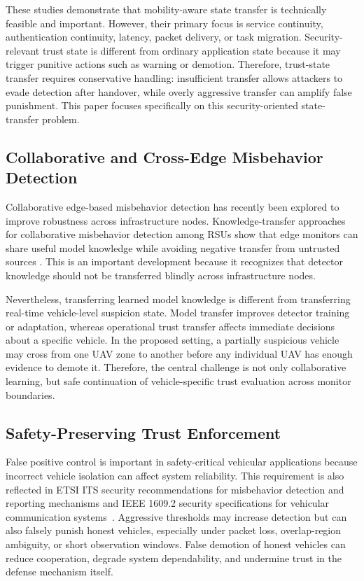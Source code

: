 \documentclass[journal]{IEEEtran}
\begin{document}
These studies demonstrate that mobility-aware state transfer is technically feasible and important. However, their primary focus is service continuity, authentication continuity, latency, packet delivery, or task migration. Security-relevant trust state is different from ordinary application state because it may trigger punitive actions such as warning or demotion. Therefore, trust-state transfer requires conservative handling: insufficient transfer allows attackers to evade detection after handover, while overly aggressive transfer can amplify false punishment. This paper focuses specifically on this security-oriented state-transfer problem.

\subsection{Collaborative and Cross-Edge Misbehavior Detection}
\label{subsec:rw_collaborative_detection}

Collaborative edge-based misbehavior detection has recently been explored to improve robustness across infrastructure nodes. Knowledge-transfer approaches for collaborative misbehavior detection among RSUs show that edge monitors can share useful model knowledge while avoiding negative transfer from untrusted sources \cite{sedar2024KnowledgeTransfer}. This is an important development because it recognizes that detector knowledge should not be transferred blindly across infrastructure nodes.

Nevertheless, transferring learned model knowledge is different from transferring real-time vehicle-level suspicion state. Model transfer improves detector training or adaptation, whereas operational trust transfer affects immediate decisions about a specific vehicle. In the proposed setting, a partially suspicious vehicle may cross from one UAV zone to another before any individual UAV has enough evidence to demote it. Therefore, the central challenge is not only collaborative learning, but safe continuation of vehicle-specific trust evaluation across monitor boundaries.

\subsection{Safety-Preserving Trust Enforcement}
\label{subsec:rw_safety_enforcement}

False positive control is important in safety-critical vehicular
applications because incorrect vehicle isolation can affect system
reliability. This requirement is also reflected in ETSI ITS security
recommendations for misbehavior detection and reporting mechanisms and IEEE
1609.2 security specifications for vehicular communication
systems~\cite{etsi2020,ieee1609}. Aggressive thresholds may increase detection but can also
falsely punish honest vehicles, especially under packet loss, overlap-region
ambiguity, or short observation windows. False demotion of honest vehicles
can reduce cooperation, degrade system dependability, and undermine trust in
the defense mechanism itself.
\end{document}
